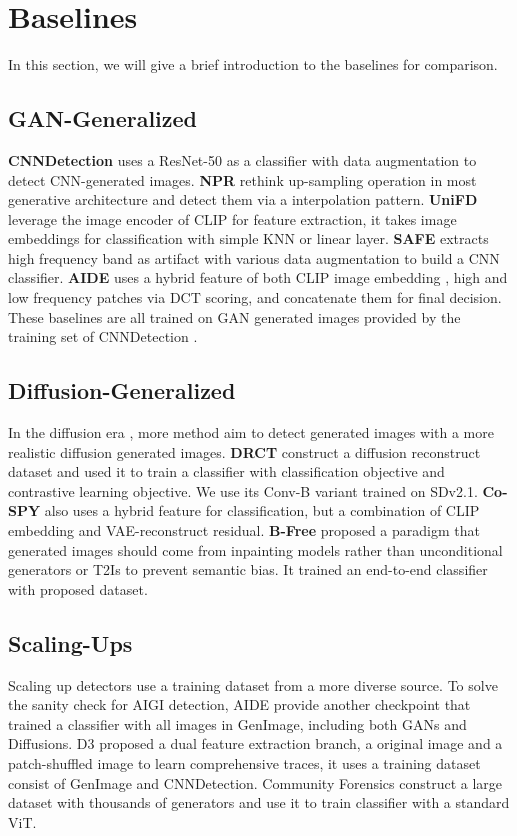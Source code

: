 \section{Baselines}
\label{sec:baseline}
    In this section, we will give a brief introduction to the baselines for comparison.

\subsection{GAN-Generalized}
\textbf{CNNDetection} \cite{wang2020cnn} uses a ResNet-50 as a classifier with data augmentation to detect CNN-generated images. \textbf{NPR} \cite{tan2024rethinking} rethink up-sampling operation in most generative architecture and detect them via a interpolation pattern. \textbf{UniFD} \cite{ojha2023towards} leverage the image encoder of CLIP for feature extraction, it takes image embeddings for classification with simple KNN or linear layer. \textbf{SAFE}\cite{li2025improving} extracts high frequency band as artifact with various data augmentation to build a CNN classifier. \textbf{AIDE} uses a hybrid feature of both CLIP image embedding , high and low frequency patches via DCT scoring, and concatenate them for final decision. These baselines are all trained on GAN generated images provided by the training set of CNNDetection \cite{wang2020cnn}. 

\subsection{Diffusion-Generalized}
In the diffusion era \cite{rombach2022high}, more method aim to detect generated images with a more realistic diffusion generated images. \textbf{DRCT} \cite{chen2024drct} construct a diffusion reconstruct dataset and used it to train a classifier with classification objective and contrastive learning objective. We use its Conv-B variant trained on SDv2.1. \textbf{Co-SPY} \cite{cheng2025co} also uses a hybrid feature for classification, but a combination of CLIP embedding and VAE-reconstruct residual. \textbf{B-Free} \cite{Guillaro2024biasfree} proposed a paradigm that generated images should come from inpainting models rather than unconditional generators or T2Is to prevent semantic bias. It trained an end-to-end classifier with proposed dataset. 

\subsection{Scaling-Ups}
Scaling up detectors use a training dataset from a more diverse source. To solve the sanity check for AIGI detection, AIDE \cite{yan2024sanity} provide another checkpoint that trained a classifier with all images in GenImage, including both GANs and Diffusions. D3 \cite{yang2025d3} proposed a dual feature extraction branch, a original image and a patch-shuffled image to learn comprehensive traces, it uses a training dataset consist of GenImage and CNNDetection. Community Forensics construct a large dataset with thousands of generators and use it to train classifier with a standard ViT.

